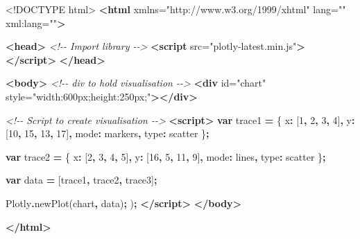 \documentclass[
]{krantz}
\makeatletter
\newenvironment{Shaded}{\begin{snugshade}}{\end{snugshade}}
\newcommand{\CommentTok}[1]{\textcolor[rgb]{0.37,0.37,0.37}{\textit{#1}}}
\newcommand{\DataTypeTok}[1]{\textcolor[rgb]{0.27,0.27,0.27}{#1}}
\newcommand{\DecValTok}[1]{\textcolor[rgb]{0.06,0.06,0.06}{#1}}
\newcommand{\FunctionTok}[1]{\textcolor[rgb]{0,0,0}{#1}}
\newcommand{\KeywordTok}[1]{\textcolor[rgb]{0.27,0.27,0.27}{\textbf{#1}}}
\newcommand{\NormalTok}[1]{#1}
\newcommand{\OperatorTok}[1]{\textcolor[rgb]{0.43,0.43,0.43}{\textbf{#1}}}
\newcommand{\OtherTok}[1]{\textcolor[rgb]{0.37,0.37,0.37}{#1}}
\newcommand{\StringTok}[1]{\textcolor[rgb]{0.5,0.5,0.5}{#1}}
\newenvironment{kframe}{%
\medskip{}
\setlength{\fboxsep}{.8em}
 \def\at@end@of@kframe{}%
 \ifinner\ifhmode%
  \def\at@end@of@kframe{\end{minipage}}%
  \begin{minipage}{\columnwidth}%
 \fi\fi%
 \def\FrameCommand##1{\hskip\@totalleftmargin \hskip-\fboxsep
 \colorbox{shadecolor}{##1}\hskip-\fboxsep
     \hskip-\linewidth \hskip-\@totalleftmargin \hskip\columnwidth}%
 \MakeFramed {\advance\hsize-\width
   \@totalleftmargin\z@ \linewidth\hsize
   \@setminipage}}%
 {\par\unskip\endMakeFramed%
 \at@end@of@kframe}
\renewenvironment{Shaded}{\begin{kframe}}{\end{kframe}}
\makeatother
\begin{document}
\begin{Shaded}
\begin{Highlighting}[]
\DataTypeTok{\textless{}!DOCTYPE }\NormalTok{html}\DataTypeTok{\textgreater{}}
\KeywordTok{\textless{}html}\OtherTok{ xmlns=}\StringTok{"http://www.w3.org/1999/xhtml"}\OtherTok{ lang=}\StringTok{""}\OtherTok{ xml:lang=}\StringTok{""}\KeywordTok{\textgreater{}}

\KeywordTok{\textless{}head\textgreater{}}
  \CommentTok{\textless{}!{-}{-} Import library {-}{-}\textgreater{}}
  \KeywordTok{\textless{}script}\OtherTok{ src=}\StringTok{"plotly{-}latest.min.js"}\KeywordTok{\textgreater{}\textless{}/script\textgreater{}}
\KeywordTok{\textless{}/head\textgreater{}}

\KeywordTok{\textless{}body\textgreater{}}
  \CommentTok{\textless{}!{-}{-} div to hold visualisation {-}{-}\textgreater{}}
  \KeywordTok{\textless{}div}\OtherTok{ id=}\StringTok{"chart"}\OtherTok{ style=}\StringTok{"width:600px;height:250px;"}\KeywordTok{\textgreater{}\textless{}/div\textgreater{}}

  \CommentTok{\textless{}!{-}{-} Script to create visualisation {-}{-}\textgreater{}}
  \KeywordTok{\textless{}script\textgreater{}}
    \KeywordTok{var}\NormalTok{ trace1 }\OperatorTok{=}\NormalTok{ \{}
      \DataTypeTok{x}\OperatorTok{:}\NormalTok{ [}\DecValTok{1}\OperatorTok{,} \DecValTok{2}\OperatorTok{,} \DecValTok{3}\OperatorTok{,} \DecValTok{4}\NormalTok{]}\OperatorTok{,}
      \DataTypeTok{y}\OperatorTok{:}\NormalTok{ [}\DecValTok{10}\OperatorTok{,} \DecValTok{15}\OperatorTok{,} \DecValTok{13}\OperatorTok{,} \DecValTok{17}\NormalTok{]}\OperatorTok{,}
      \DataTypeTok{mode}\OperatorTok{:} \StringTok{\textquotesingle{}markers\textquotesingle{}}\OperatorTok{,}
      \DataTypeTok{type}\OperatorTok{:} \StringTok{\textquotesingle{}scatter\textquotesingle{}}
\NormalTok{    \}}\OperatorTok{;}

    \KeywordTok{var}\NormalTok{ trace2 }\OperatorTok{=}\NormalTok{ \{}
      \DataTypeTok{x}\OperatorTok{:}\NormalTok{ [}\DecValTok{2}\OperatorTok{,} \DecValTok{3}\OperatorTok{,} \DecValTok{4}\OperatorTok{,} \DecValTok{5}\NormalTok{]}\OperatorTok{,}
      \DataTypeTok{y}\OperatorTok{:}\NormalTok{ [}\DecValTok{16}\OperatorTok{,} \DecValTok{5}\OperatorTok{,} \DecValTok{11}\OperatorTok{,} \DecValTok{9}\NormalTok{]}\OperatorTok{,}
      \DataTypeTok{mode}\OperatorTok{:} \StringTok{\textquotesingle{}lines\textquotesingle{}}\OperatorTok{,}
      \DataTypeTok{type}\OperatorTok{:} \StringTok{\textquotesingle{}scatter\textquotesingle{}}
\NormalTok{    \}}\OperatorTok{;}

    \KeywordTok{var}\NormalTok{ data }\OperatorTok{=}\NormalTok{ [trace1}\OperatorTok{,}\NormalTok{ trace2}\OperatorTok{,}\NormalTok{ trace3]}\OperatorTok{;}

\NormalTok{    Plotly}\OperatorTok{.}\FunctionTok{newPlot}\NormalTok{(}\StringTok{\textquotesingle{}chart\textquotesingle{}}\OperatorTok{,}\NormalTok{ data)}\OperatorTok{;}
\NormalTok{    )}\OperatorTok{;}
  \KeywordTok{\textless{}/script\textgreater{}}
\KeywordTok{\textless{}/body\textgreater{}}

\KeywordTok{\textless{}/html\textgreater{}}
\end{Highlighting}
\end{Shaded}
\end{document}
